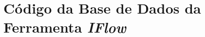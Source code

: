 \chapter{Código da Base de Dados da Ferramenta \textit{IFlow}}

\label{ap:db_sql}

\inputminted[linenos,tabsize=2,breaklines]{sql}{figuras/Codigos/Fisico.sql}